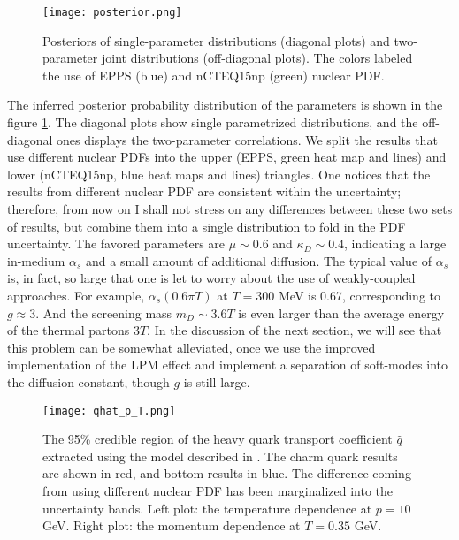 \begin{figure}
\singlespacing
\centering
\texttt{[image: posterior.png]}
\caption[Posteriors of single-parameter distributions (diagonal plots) and]{Posteriors of single-parameter distributions (diagonal plots) and two-parameter joint distributions (off-diagonal plots). The colors labeled the use of EPPS (blue) and nCTEQ15np (green) nuclear PDF.}
\label{fig:LBT:posterior}
\end{figure}

The inferred posterior probability distribution of the parameters is shown in the figure \ref{fig:LBT:posterior}.
The diagonal plots show single parametrized distributions, and the off-diagonal ones displays the two-parameter correlations.
We split the results that use different nuclear PDFs into the upper (EPPS, green heat map and lines) and lower (nCTEQ15np, blue heat maps and lines) triangles.
One notices that the results from different nuclear PDF are consistent within the uncertainty; therefore, from now on I shall not stress on any differences between these two sets of results, but combine them into a single distribution to fold in the PDF uncertainty.
The favored parameters are $\mu \sim 0.6$ and $\kappa_D \sim 0.4$, indicating a large in-medium $\alpha_s$ and a small amount of additional diffusion.
The typical value of $\alpha_s$ is, in fact, so large that one is let to worry about the use of weakly-coupled approaches.
For example, $\alpha_s(0.6\pi T)$ at $T=300$ MeV is 0.67, corresponding to $g \approx 3$. 
And the screening mass $m_D \sim 3.6 T$ is even larger than the average energy of the thermal partons $3T$. 
In the discussion of the next section, we will see that this problem can be somewhat alleviated, once we use the improved implementation of the LPM effect and implement a separation of soft-modes into the diffusion constant, though $g$ is still large.

\begin{figure}
\singlespacing
\centering
\texttt{[image: qhat\_p\_T.png]}
\caption[The 95\% credible region of the heavy quark transport coefficient]{The 95\% credible region of the heavy quark transport coefficient $\hat{q}$ extracted using the model described in \cite{Ke:2018tsh}.
The charm quark results are shown in red, and bottom results in blue.
The difference coming from using different nuclear PDF has been marginalized into the uncertainty bands.
Left plot: the temperature dependence at $p=10$ GeV. Right plot: the momentum dependence at $T=0.35$ GeV.
}\label{fig:LBT:posterior_qhat}
\end{figure}

